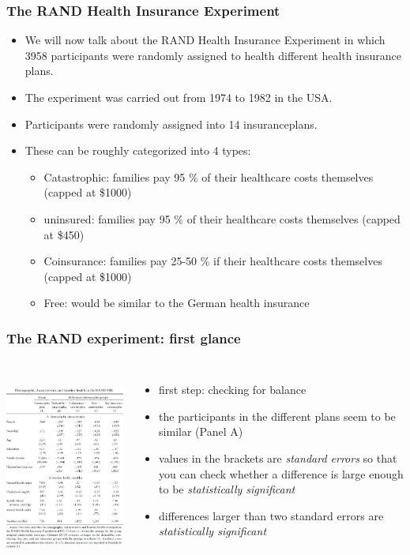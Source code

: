 \documentclass{beamer}
\begin{document}
\begin{frame}
\frametitle{The RAND Health Insurance Experiment}
\begin{itemize}
\item We will now talk about the RAND Health Insurance Experiment  in which 3958 participants were randomly assigned to health different health insurance plans.
\item The experiment was carried out from 1974 to 1982 in the USA.
\item Participants were randomly assigned into 14 insuranceplans. 
\item These can be roughly categorized into 4 types:
	\begin{itemize} 
	\item Catastrophic: families pay 95 \% of their healthcare costs themselves (capped at \$1000)
	\item uninsured: families pay 95 \% of their healthcare costs themselves (capped at \$450)
	\item Coinsurance: families pay 25-50 \% if their healthcare costs themselves (capped at \$1000)
	\item Free: would be similar to the German health insurance
	\end{itemize}
\end{itemize}

\end{frame}
\begin{frame}
\frametitle{The RAND experiment: first glance}
\begin{columns}
\includegraphics[width=10cm,height=6.5cm,keepaspectratio]{RAND Table 2} 

\begin{itemize}
	\item first step: checking for balance
	\item the participants in the different plans seem to be similar (Panel A)
	\item values in the brackets are \textit{standard errors} so that you can check whether a difference is large enough to be \textit{statistically significant}
	\item differences larger than two standard errors are \textit{statistically significant}
\end{itemize}

\end{columns}
\end{frame}
\end{document}
